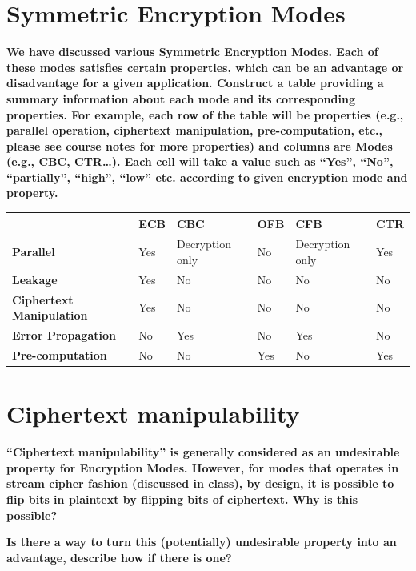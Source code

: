 \documentclass[letterpaper,11pt,notitlepage,fleqn]{article}
\begin{document}
\section{Symmetric Encryption Modes}
\noindent \textbf{We have discussed various Symmetric Encryption Modes. Each of  these modes  satisfies certain properties, which can be  an  advantage or disadvantage  for  a given  application. Construct a  table providing a  summary  information  about  each mode and  its corresponding properties. For example,  each  row  of  the  table  will  be  properties  (e.g.,  parallel  operation,  ciphertext manipulation,  pre-computation,  etc.,  please  see  course  notes  for  more  properties)  and  columns are  Modes  (e.g.,  CBC,  CTR…).  Each  cell  will  take  a  value  such  as  “Yes”,  “No”,  “partially”, “high”, “low” etc. according to given encryption mode and property.}
\begin{center}
\begin{tabular}{|l|l|l|l|l|l|}
    \hline
    & \textbf{ECB} & \textbf{CBC} & \textbf{OFB} & \textbf{CFB} & \textbf{CTR} \\ \hline
    \textbf{Parallel} & Yes & Decryption only & No & Decryption only & Yes \\ \hline
    \textbf{Leakage} & Yes & No & No & No & No \\ \hline
    \textbf{Ciphertext Manipulation} & Yes & No & No & No & No \\ \hline
    \textbf{Error Propagation} & No & Yes & No & Yes & No \\ \hline
    \textbf{Pre-computation} & No & No & Yes & No & Yes \\ \hline
\end{tabular}
\end{center}
\section{Ciphertext  manipulability}
\noindent \textbf{“Ciphertext  manipulability”  is  generally  considered  as  an  undesirable  property  for Encryption  Modes.  However,  for  modes  that  operates  in  stream  cipher  fashion  (discussed  in class), by design, it is possible to flip bits in plaintext by flipping bits of ciphertext. Why is this possible?}


\noindent \textbf{Is  there  a  way  to  turn  this  (potentially)  undesirable  property  into  an  advantage, describe how if there is one?}
\end{document}
